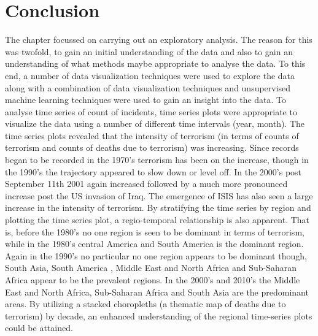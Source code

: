 \section{Conclusion}
The chapter focussed on carrying out an exploratory analysis. The reason for this was twofold, to gain an initial understanding of the data and also to gain an understanding of what methods maybe appropriate to analyse the data. To this end, a number of data visualization techniques were used to explore the data along with a combination of data visualization techniques and unsupervised machine learning techniques were used to gain an insight into the data. To analyse time series of count of incidents, time series plots were appropriate to visualize the data using a number of different time intervals (year, month). The time series plots revealed that the intensity of terrorism (in terms of counts of terrorism and counts of deaths due to terrorism) was increasing. Since records began to be recorded in the 1970’s terrorism has been on the increase, though in the 1990’s the trajectory appeared to slow down or level off. In the 2000’s post September 11th 2001 again increased followed by a much more pronounced increase post the US invasion of Iraq. The emergence of ISIS has also seen a large increase in the intensity of terrorism. 
By stratifying the time series by region and plotting the time series plot, a regio-temporal relationship is also apparent. That is, before the 1980’s no one region is seen to be dominant in terms of terrorism, while in the 1980’s central America and South America is the dominant region. Again in the 1990’s no particular no one region appears to be dominant though, South Asia, South America , Middle East and North Africa and Sub-Saharan Africa appear to be the prevalent regions. In the 2000’s and 2010’s  the Middle East and North Africa, Sub-Saharan Africa and South Asia are the predominant areas.  By utilizing a stacked choropleths (a thematic map of deaths due to terrorism) by decade, an enhanced understanding of the regional time-series plots could be attained. 


